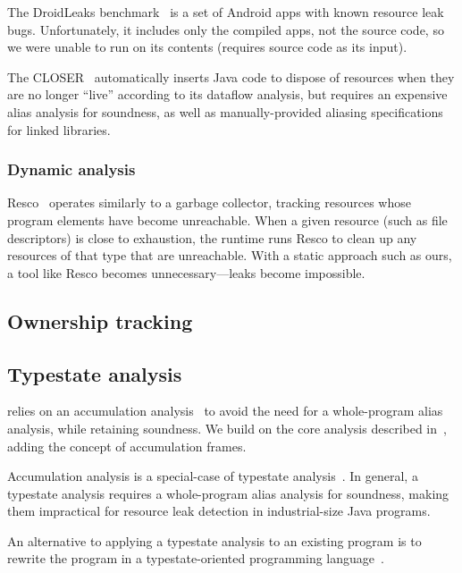 The DroidLeaks benchmark~\cite{liu2019droidleaks} is a set of Android
apps with known resource leak bugs. Unfortunately, it includes only
the compiled apps, not the source code, so we were unable to run \tool
on its contents (\tool requires source code as its input).

The CLOSER~\cite{dillig2008closer} automatically inserts Java code to
dispose of resources when they are no longer ``live'' according to its
dataflow analysis, but requires an expensive alias analysis for
soundness, as well as manually-provided aliasing specifications for
linked libraries.


\subsubsection{Dynamic analysis}

Resco~\cite{dai2013resco} operates similarly to a garbage collector,
tracking resources whose program elements have become
unreachable. When a given resource (such as file descriptors) is close
to exhaustion, the runtime runs Resco to clean up any resources of
that type that are unreachable.  With a static approach such as ours,
a tool like Resco becomes unnecessary---leaks become impossible.

\subsection{Ownership tracking}



\subsection{Typestate analysis}
\label{sec:rw-typestate}

\tool relies on an accumulation
analysis~\cite{kellogg20verifying,FahndrichLeino03} to avoid the need
for a whole-program alias analysis, while retaining soundness.  We
build on the core analysis described in~\cite{kellogg20verifying},
adding the concept of accumulation frames.

Accumulation analysis is a special-case of typestate analysis~\cite{StromY86}.
In general, a typestate analysis requires a whole-program alias analysis
for soundness, making them impractical for resource leak detection
in industrial-size Java programs. 

An alternative to applying a typestate analysis to an existing program
is to rewrite the program in a typestate-oriented programming
language~\cite{AldrichSSS2009}. 
